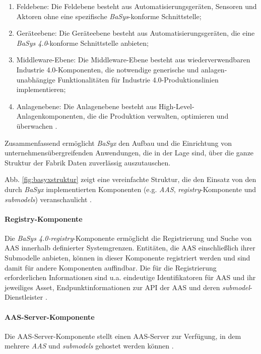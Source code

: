 \begin{enumerate}
    \item Feldebene: Die Feldebene besteht aus Automatisierungsgeräten, Sensoren und Aktoren ohne eine spezifische \textit{BaSys}-konforme Schnittstelle;
    \item Geräteebene: Die Geräteebene besteht aus Automatisierungsgeräten, die eine \textit{BaSys 4.0}-konforme Schnittstelle anbieten;
    \item Middleware-Ebene: Die Middleware-Ebene besteht aus wiederverwendbaren Industrie 4.0-Komponenten, die notwendige generische und anlagen-unabhängige Funktionalitäten für Industrie 4.0-Produktionslinien implementieren;
    \item Anlagenebene: Die Anlagenebene besteht aus High-Level-Anlagenkomponenten, die die Produktion verwalten, optimieren und überwachen \cite{eclipsefoundationinc.BaSyxEclipsepedia}.
\end{enumerate}
    
Zusammenfassend ermöglicht \textit{BaSyx} den Aufbau und die Einrichtung von unternehmensübergreifenden Anwendungen, die in der Lage sind, über die ganze Struktur der Fabrik Daten zuverlässig auszutauschen.

Abb. \ref{fig:basyxstruktur} zeigt eine vereinfachte Struktur, die den Einsatz von den durch \textit{BaSyx} implementierten Komponenten (e.g. \textit{AAS}, \textit{registry}-Komponente und \textit{submodels}) veranschaulicht \cite{eclipsefoundationinc.BaSyxEclipsepedia}.





\paragraph{Registry-Komponente}

Die \textit{BaSys 4.0-registry}-Komponente ermöglicht die Registrierung und Suche von AAS innerhalb definierter Systemgrenzen. Entitäten, die AAS einschließlich ihrer Submodelle anbieten, können in dieser Komponente registriert werden und sind damit für andere Komponenten auffindbar. Die für die Registrierung erforderlichen Informationen sind u.a. eindeutige Identifikatoren für AAS und ihr jeweiliges Asset, Endpunktinformationen zur API der AAS und deren \textit{submodel}-Dienstleister \cite{eclipsefoundationinc.BaSyxEclipsepedia}.


\paragraph{AAS-Server-Komponente}

Die AAS-Server-Komponente stellt einen AAS-Server zur Verfügung, in dem mehrere \textit{AAS} und \textit{submodels} gehostet werden können \cite{eclipsefoundationinc.BaSyxEclipsepedia}.

